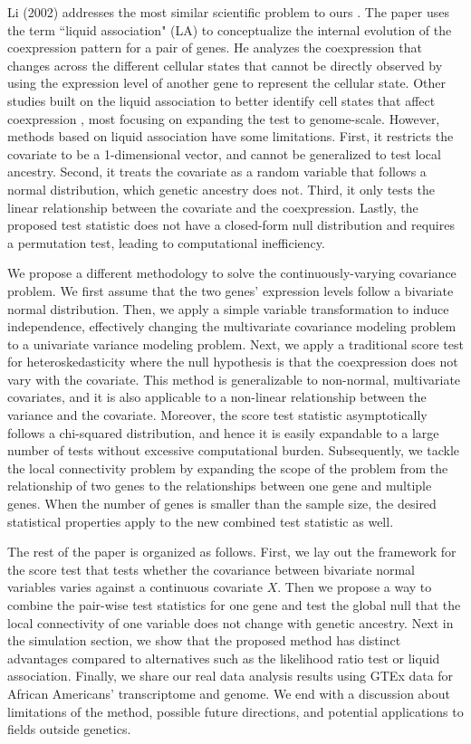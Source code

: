 \documentclass[aoas,preprint]{imsart}
\numberwithin{equation}{section}
\theoremstyle{plain}
\begin{document}
Li (2002) addresses the most similar scientific problem to ours \cite{li2002genome, li2004system}. The paper uses the term ``liquid association" (LA) to conceptualize the internal evolution of the coexpression pattern for a pair of genes. He analyzes the coexpression that changes across the different cellular states that cannot be directly observed by using the expression level of another gene to represent the cellular state. Other studies built on the liquid association to better identify cell states that affect coexpression \cite{dunlop2008regulatory, yu2018new, yan2017detecting}, most focusing on expanding the test to genome-scale. However, methods based on liquid association have some limitations. First, it restricts the covariate to be a 1-dimensional vector, and cannot be generalized to test local ancestry. Second, it treats the covariate as a random variable that follows a normal distribution, which genetic ancestry does not. Third, it only tests the linear relationship between the covariate and the coexpression. Lastly, the proposed test statistic does not have a closed-form null distribution and requires a permutation test, leading to computational inefficiency. \bigskip

We propose a different methodology to solve the continuously-varying covariance problem. We first assume that the two genes' expression levels follow a bivariate normal distribution. Then, we apply a simple variable transformation to induce independence, effectively changing the multivariate covariance modeling problem to a univariate variance modeling problem. Next, we apply a traditional score test for heteroskedasticity \cite{breusch1979simple} where the null hypothesis is that the coexpression does not vary with the covariate. This method is generalizable to non-normal, multivariate covariates, and it is also applicable to a non-linear relationship between the variance and the covariate. Moreover, the score test statistic asymptotically follows a chi-squared distribution, and hence it is easily expandable to a large number of tests without excessive computational burden. Subsequently, we tackle the local connectivity problem by expanding the scope of the problem from the relationship of two genes to the relationships between one gene and multiple genes. When the number of genes is smaller than the sample size, the desired statistical properties apply to the new combined test statistic as well. \bigskip

The rest of the paper is organized as follows. First, we lay out the framework for the score test that tests whether the covariance between bivariate normal variables varies against a continuous covariate $X$. Then we propose a way to combine the pair-wise test statistics for one gene and test the global null that the local connectivity of one variable does not change with genetic ancestry. Next in the simulation section, we show that the proposed method has distinct advantages compared to alternatives such as the likelihood ratio test or liquid association. Finally, we share our real data analysis results using GTEx data for African Americans' transcriptome and genome. We end with a discussion about limitations of the method, possible future directions, and potential applications to fields outside genetics.\bigskip
\end{document}

